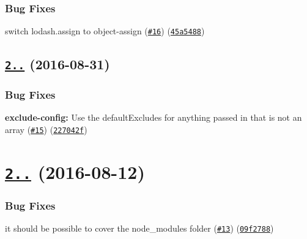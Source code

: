\subsubsection*{Bug Fixes}


\begin{DoxyItemize}
\item switch lodash.\+assign to object-\/assign (\href{https://github.com/istanbuljs/test-exclude/issues/16}{\tt \#16}) (\href{https://github.com/istanbuljs/test-exclude/commit/45a5488}{\tt 45a5488})
\end{DoxyItemize}

\label{_2.1.2}%
 \subsection*{\href{https://github.com/istanbuljs/test-exclude/compare/v2.1.1...v2.1.2}{\tt 2..} (2016-\/08-\/31)}

\subsubsection*{Bug Fixes}


\begin{DoxyItemize}
\item {\bfseries exclude-\/config\+:} Use the default\+Excludes for anything passed in that is not an array (\href{https://github.com/istanbuljs/test-exclude/issues/15}{\tt \#15}) (\href{https://github.com/istanbuljs/test-exclude/commit/227042f}{\tt 227042f})
\end{DoxyItemize}

\label{_2.1.1}%
 \section*{\href{https://github.com/istanbuljs/test-exclude/compare/v2.1.0...v2.1.1}{\tt 2..} (2016-\/08-\/12)}

\subsubsection*{Bug Fixes}


\begin{DoxyItemize}
\item it should be possible to cover the node\+\_\+modules folder (\href{https://github.com/istanbuljs/test-exclude/issues/13}{\tt \#13}) (\href{https://github.com/istanbuljs/test-exclude/commit/09f2788}{\tt 09f2788})
\end{DoxyItemize}

